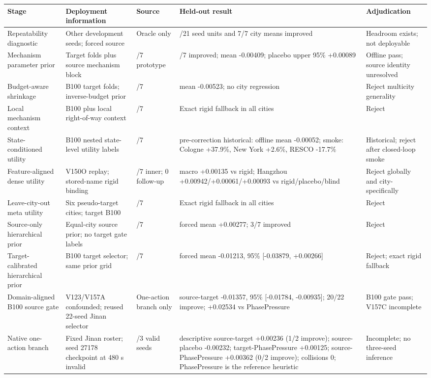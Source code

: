 \begin{tabular}{@{}>{\raggedright\arraybackslash}p{}>{\raggedright\arraybackslash}p{}>{\raggedright\arraybackslash}p{}>{\raggedright\arraybackslash}p{}>{\raggedright\arraybackslash}p{}@{}}
\toprule
Stage & Deployment information & Source & Held-out result & Adjudication \\
\midrule
Repeatability diagnostic & Other development seeds; forced source & Oracle only & 16/21 seed units and 7/7 city means improved & Headroom exists; not deployable \\
Mechanism parameter prior & Target folds plus source mechanism block & 7/7 prototype & 6/7 improved; mean -0.00409; placebo upper 95\% +0.00089 & Offline pass; source identity unresolved \\
Budget-aware shrinkage & B100 target folds; inverse-budget prior & 1/7 & mean -0.00523; no city regression & Reject multicity generality \\
Local mechanism context & B100 plus local right-of-way context & 0/7 & Exact rigid fallback in all cities & Reject \\
State-conditioned utility & B100 nested state-level utility labels & 3/7 & pre-correction historical: offline mean -0.00052; smoke: Cologne +37.9\%, New York +2.6\%, RESCO -17.7\% & Historical; reject after closed-loop smoke \\
Feature-aligned dense utility & V150O replay; stored-name rigid binding & 1/7 inner; 0 follow-up & macro +0.00135 vs rigid; Hangzhou +0.00942/+0.00061/+0.00093 vs rigid/placebo/blind & Reject globally and city-specifically \\
Leave-city-out meta utility & Six pseudo-target cities; target B100 & 0/7 & Exact rigid fallback in all cities & Reject \\
Source-only hierarchical prior & Equal-city source prior; no target gate labels & 0/7 & forced mean +0.00277; 3/7 improved & Reject \\
Target-calibrated hierarchical prior & B100 target selector; same prior grid & 0/7 & forced mean -0.01213, 95\% [-0.03879, +0.00266] & Reject; exact rigid fallback \\
Domain-aligned B100 source gate & V123/V157A confounded; reused 22-seed Jinan selector & One-action branch only & source-target -0.01357, 95\% [-0.01784, -0.00935]; 20/22 improve; +0.02534 vs PhasePressure & B100 gate pass; V157C incomplete \\
Native one-action branch & Fixed Jinan roster; seed 27178 checkpoint at 480 s invalid & 2/3 valid seeds & descriptive source-target +0.00236 (1/2 improve); source-placebo -0.00232; target-PhasePressure +0.00125; source-PhasePressure +0.00362 (0/2 improve); collisions 0; PhasePressure is the reference heuristic & Incomplete; no three-seed inference \\

\end{tabular}
